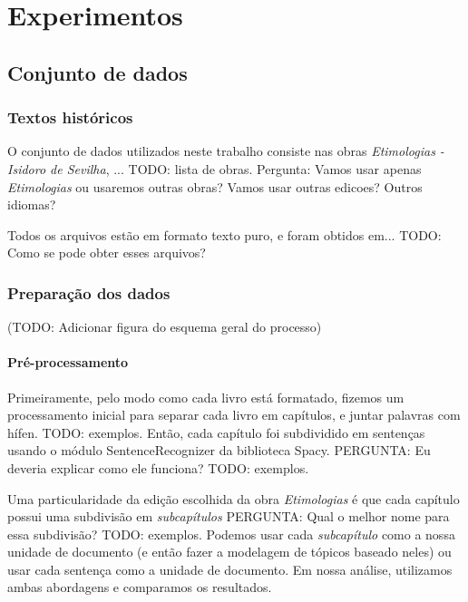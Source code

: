 
\chapter{Experimentos}

\section{Conjunto de dados}
\subsection{Textos históricos}
O conjunto de dados utilizados neste trabalho consiste nas obras \textit{Etimologias - Isidoro de Sevilha}, ... TODO: lista de obras. Pergunta: Vamos usar apenas \textit{Etimologias} ou usaremos outras obras? Vamos usar outras edicoes? Outros idiomas?

Todos os arquivos estão em formato texto puro, e foram obtidos em... TODO: Como se pode obter esses arquivos?

\subsection{Preparação dos dados}
(TODO: Adicionar figura do esquema geral do processo)
\subsubsection{Pré-processamento}
Primeiramente, pelo modo como cada livro está formatado, fizemos um processamento inicial para separar cada livro em capítulos, e juntar palavras com hífen. TODO: exemplos.
Então, cada capítulo foi subdividido em sentenças usando o módulo SentenceRecognizer da biblioteca Spacy. PERGUNTA: Eu deveria explicar como ele funciona? TODO: exemplos.

Uma particularidade da edição escolhida da obra \textit{Etimologias} é que cada capítulo possui uma subdivisão em \textit{subcapítulos} PERGUNTA: Qual o melhor nome para essa subdivisão? TODO: exemplos. Podemos usar cada \textit{subcapítulo} como a nossa unidade de documento (e então fazer a modelagem de tópicos baseado neles) ou usar cada sentença como a unidade de documento. Em nossa análise, utilizamos ambas abordagens e comparamos os resultados.

